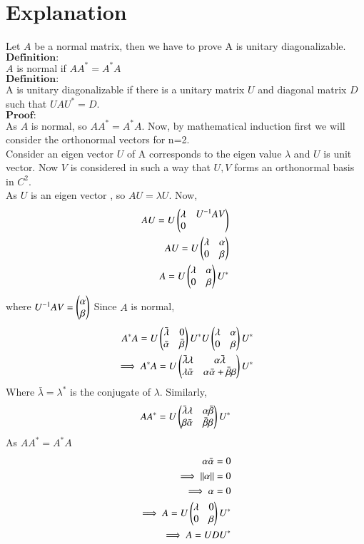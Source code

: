 \documentclass[journal,12pt,twocolumn]{IEEEtran}
\begin{document}
\section{Explanation}
Let $A$ be a normal matrix, then we have to prove A is unitary diagonalizable.\\
$\textbf{Definition:}$\\
$A$ is normal if $A A^* = A^* A$\\
$\textbf{Definition:}$\\
A is unitary diagonalizable if there is a unitary matrix $U$ and diagonal matrix $D$ such that $UAU^* = D$.\\
$\textbf{Proof:}$\\
As $A$ is normal, so $A A^* = A^* A$. Now, by mathematical induction first we will consider the orthonormal vectors for n=2.\\
Consider an eigen vector $U$ of A corresponds to the eigen value $\lambda$ and $U$ is unit vector. Now $V$ is considered in such a way that ${U, V}$ forms an orthonormal basis in $C^2$.\\
As $U$ is an eigen vector , so $AU=\lambda U$.
Now,
\begin{align}
AU = U \begin{pmatrix}\lambda & U^{-1}AV\\0\end{pmatrix}\\
AU = U \begin{pmatrix}\lambda & \alpha\\0 & \beta\end{pmatrix}\\
A = U \begin{pmatrix}\lambda & \alpha\\0 & \beta\end{pmatrix} U^*
\end{align}
where $U^{-1}AV = \begin{pmatrix}\alpha\\\beta\end{pmatrix}$
Since $A$ is normal, 
\begin{align}
A^* A = U \begin{pmatrix}\bar{\lambda} & 0\\\bar{\alpha} & \bar{\beta}\end{pmatrix} U^* U \begin{pmatrix}\lambda & \alpha\\0 & \beta\end{pmatrix} U^*\\
\implies A^* A = U \begin{pmatrix}\bar{\lambda}\lambda & \alpha\bar{\lambda}\\\lambda\bar{\alpha} & \alpha\bar{\alpha}+\bar{\beta}\beta\end{pmatrix}U^*
\end{align}
Where $\bar{\lambda} = \lambda ^*$ is the conjugate of $\lambda$.
Similarly,
\begin{align}
A A^* =  U \begin{pmatrix}\bar{\lambda}\lambda & \alpha\bar{\beta}\\\beta\bar{\alpha} & \bar{\beta}\beta\end{pmatrix}U^*
\end{align}
As $A A^* = A^* A$
\begin{align}
\alpha\bar{\alpha} = 0\\
\implies \left\lVert\alpha\right\rVert = 0\\
\implies \alpha =0\\
\implies A = U \begin{pmatrix}\lambda & 0\\0 & \beta\end{pmatrix} U^*\\
\implies A = U D U^*
\end{align}
\end{document}
